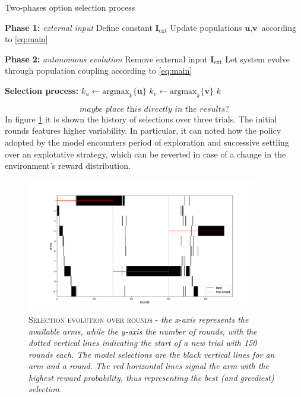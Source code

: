 \hfill \break
\begin{algorithm}[H]
\caption{Two-phases option selection process}
\label{alg:decision}
\SetAlgoLined
{}


\textbf{Phase 1:} \textit{external input} 
Define constant $\textbf{I}_{\text{ext}}$\;
Update populations $\textbf{u}, \textbf{v}$ according to \ref{eq:main}\;

\textbf{Phase 2:} \textit{autonomous evolution} 
Remove external input $\textbf{I}_{\text{ext}}$\;
Let system evolve through population coupling according to \ref{eq:main}\;

\textbf{Selection process:}\;
$k_{u} \gets \text{argmax}_{k}\{\textbf{u}\}$\;
$k_{v} \gets \text{argmax}_{k}\{\textbf{v}\}$\;
\Return $k$
\end{algorithm}\label{alg:decision1}

\[\textit{maybe place this directly in the results?}\]
\noindent In figure \ref{fig:sel1} it is shown the history of selections over three trials. The initial rounds features higher variability. In particular, it can noted how the policy adopted by the model encounters period of exploration and successive settling over an explotative strategy, which can be reverted in case of a change in the environment's reward distribution.

\begin{figure}[ht]
    \centering
    \includegraphics[width=0.9\textwidth]{figures/selections_1.png}
    \caption{\textsc{Selection evolution over rounds} - \textit{the x-axis represents the available arms, while the y-axis the number of rounds, with the dotted vertical lines indicating the start of a new trial with 150 rounds each. The model selections are the black vertical lines for an arm and a
    round. The red horizontal lines signal the arm with the highest reward probability, thus representing the best (and greediest) selection.}}
    \label{fig:sel1}
\end{figure}

